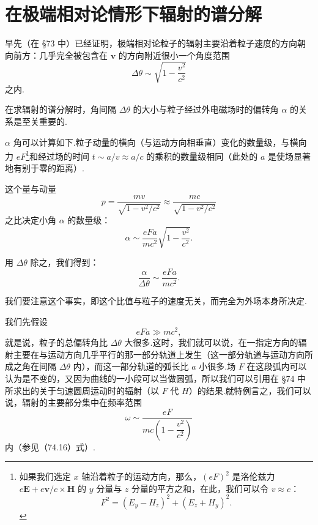 \section{在极端相对论情形下辐射的谱分解}

早先（在 §73 中）已经证明，极端相对论粒子的辐射主要沿着粒子速度的方向朝向前方：几乎完全被包含在 $\boldsymbol{v}$ 的方向附近很小一个角度范围
\begin{equation*}
  \Delta\theta\sim\sqrt{1-\frac{v^2}{c^2}}
\end{equation*}
之内.

在求辐射的谱分解时，角间隔 $\Delta\theta$ 的大小与粒子经过外电磁场时的偏转角 $\alpha$ 的关系是至关重要的.

$\alpha$ 角可以计算如下.粒子动量的横向（与运动方向相垂直）变化的数量级，与横向力 $eF$\footnote{如果我们选定 $x$ 轴沿着粒子的运动方向，那么，$(eF)^2$ 是洛伦兹力 $e\boldsymbol{E}+e\boldsymbol{v}/c\times\boldsymbol{H}$ 的 $y$ 分量与 $z$ 分量的平方之和，在此，我们可以令 $v\approx c$：
\begin{equation*}
  F^2=(E_y-H_z)^2+(E_z+H_y)^2.
\end{equation*}}和经过场的时间 $t\sim a/v\approx a/c$ 的乘积的数量级相同（此处的 $a$ 是使场显著地有别于零的距离）.

这个量与动量
\begin{equation*}
  p=\frac{mv}{\sqrt{1-v^2/c^2}}\approx\frac{mc}{\sqrt{1-v^2/c^2}}
\end{equation*}
之比决定小角 $\alpha$ 的数量级：
\begin{equation*}
  \alpha\sim\frac{eFa}{mc^2}\sqrt{1-\frac{v^2}{c^2}}.
\end{equation*}

用 $\Delta\theta$ 除之，我们得到：
\begin{equation}
  \frac{\alpha}{\Delta\theta}\sim\frac{eFa}{mc^2}.
\end{equation}

我们要注意这个事实，即这个比值与粒子的速度无关，而完全为外场本身所决定.

我们先假设
\begin{equation}
  eFa\gg mc^2,
\end{equation}
就是说，粒子的总偏转角比 $\Delta\theta$ 大很多.这时，我们就可以说，在一指定方向的辐射主要在与运动方向几乎平行的那一部分轨道上发生（这一部分轨道与运动方向所成之角在间隔 $\Delta\theta$ 内），而这一部分轨道的弧长比 $a$ 小很多.场 $F$ 在这段弧内可以认为是不变的，又因为曲线的一小段可以当做圆弧，所以我们可以引用在 §74 中所求出的关于匀速圆周运动时的辐射（以 $F$ 代 $H$）的结果.就特例言之，我们可以说，辐射的主要部分集中在频率范围
\begin{equation}
  \omega\sim\frac{eF}{mc\left(1-\dfrac{v^2}{c^2}\right)}
\end{equation}
内（参见（74.16）式）.

